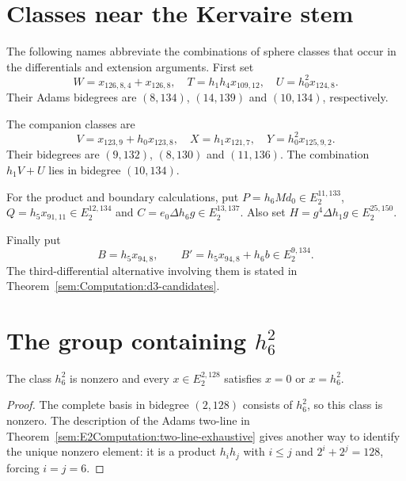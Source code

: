 \section{Classes near the Kervaire stem}


\begin{definition}
\label{sem:Computation:w-t-u}
The following names abbreviate the combinations of sphere classes that
occur in the differentials and extension arguments. First set
\[W=x_{126,8,4}+x_{126,8},\quad T=h_1h_4x_{109,12},\quad U=h_0^2x_{124,8}.\]
Their Adams bidegrees are $(8,134)$, $(14,139)$ and $(10,134)$, respectively.

The companion classes are
\[V=x_{123,9}+h_0x_{123,8},\quad X=h_1x_{121,7},\quad Y=h_0^2x_{125,9,2}.\]
Their bidegrees are $(9,132)$, $(8,130)$ and $(11,136)$. The combination $h_1V+U$ lies in bidegree $(10,134)$.

For the product and boundary calculations, put
$P=h_6Md_0\in E_2^{11,133}$, $Q=h_5x_{91,11}\in E_2^{12,134}$ and $C=e_0\Delta h_6g\in E_2^{13,137}$. Also set $H=g^4\Delta h_1g\in E_2^{25,150}$.

Finally put
\[B=h_5x_{94,8},\qquad B'=h_5x_{94,8}+h_6b\in E_2^{9,134}.\]
The third-differential alternative involving them is stated in
Theorem~\ref{sem:Computation:d3-candidates}.
\end{definition}


\section{The group containing $h_6^2$}
\begin{theorem}
\label{sem:Computation:square-line}
The class $h_6^2$ is nonzero and every $x\in E_2^{2,128}$ satisfies $x=0$ or $x=h_6^2$.
\end{theorem}
\begin{proof}
The complete basis in bidegree $(2,128)$ consists of $h_6^2$, so this
class is nonzero. The description of the Adams two-line in
Theorem~\ref{sem:E2Computation:two-line-exhaustive} gives another way to
identify the unique nonzero element: it is a product $h_ih_j$ with
$i\leq j$ and $2^i+2^j=128$, forcing $i=j=6$.
\end{proof}

